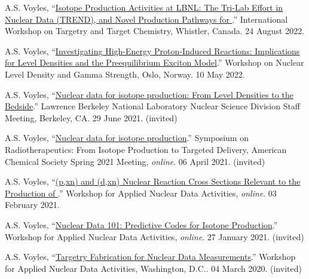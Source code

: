 \begin{bibsection}
\item A.S. Voyles, \enquote{\href{https://meetings.triumf.ca/event/108/contributions/3718/}{Isotope Production Activities at LBNL: The Tri-Lab Effort in Nuclear Data (TREND), and Novel Production Pathways for }.}  International Workshop on Targetry and Target Chemistry, Whistler, Canada. 24 August 2022.

\item A.S. Voyles, \enquote{\href{https://www.mn.uio.no/fysikk/english/research/news-and-events/events/conferences/gamma8/program/book_of_abstracts.pdf}{Investigating High-Energy Proton-Induced Reactions: Implications for Level Densities and the Preequilibrium Exciton Model}.}   Workshop on Nuclear Level Density and Gamma Strength, Oslo, Norway. 10 May 2022.

\item A.S. Voyles, \enquote{\href{https://conferences.lbl.gov/event/541/}{Nuclear data for isotope production: From Level Densities to the Bedside}.} Lawrence Berkeley National Laboratory Nuclear Science Division Staff Meeting, Berkeley, CA. 29 June 2021. (invited)



\item A.S. Voyles, \enquote{\href{https://www.morressier.com/o/event/6022c0c2e8bb0500118660c6/article/609136b66e987178c2dc86ae}{Nuclear data for isotope production}.} Symposium on Radiotherapeutics: From Isotope Production to Targeted
Delivery, American Chemical Society Spring 2021 Meeting, \emph{online}. 06 April 2021. (invited)

\item A.S. Voyles, \enquote{\href{https://conferences.lbl.gov/event/504/}{(p,xn) and (d,xn)  Nuclear Reaction Cross Sections Relevant to the Production of }.} Workshop for Applied Nuclear Data Activities, \emph{online}. 03 February 2021.

\item A.S. Voyles, \enquote{\href{https://conferences.lbl.gov/event/504/}{Nuclear Data 101: Predictive Codes for Isotope Production}.} Workshop for Applied Nuclear Data Activities, \emph{online}. 27 January 2021. (invited)

\item A.S. Voyles, \enquote{\href{https://conferences.lbl.gov/event/292/}{Targetry Fabrication for Nuclear Data Measurements}.} Workshop for Applied Nuclear Data Activities, Washington, D.C.. 04 March 2020. (invited)


\end{bibsection}
